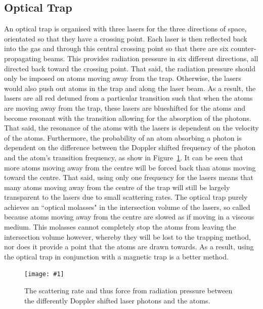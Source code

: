\documentclass[twocolumn]{article}
\newcommand{\insertFigure}[1]{%
   \texttt{[image: \#1]}%
}
\begin{document}
\subsection{Optical Trap}
An optical trap is organised with three lasers for the three directions of space, orientated so that they have a crossing point. Each laser is then reflected back into the gas and through this central crossing point so that there are six counter-propagating beams. This provides radiation pressure in six different directions, all directed back toward the crossing point. That said, the radiation pressure should only be imposed on atoms moving away from the trap. Otherwise, the lasers would also push out atoms in the trap and along the laser beam. As a result, the lasers are all red detuned from a particular transition such that when the atoms are moving away from the trap, these lasers are blueshifted for the atoms and become resonant with the transition allowing for the absorption of the photons. That said, the resonance of the atoms with the lasers is dependent on the velocity of the atoms. Furthermore, the probability of an atom absorbing a photon is dependent on the difference between the Doppler shifted frequency of the photon and the atom's transition frequency, as show in Figure~\ref{fig:Scat}. It can be seen that more atoms moving away from the centre will be forced back than atoms moving toward the centre. That said, using only one frequency for the lasers means that many atoms moving away from the centre of the trap will still be largely transparent to the lasers due to small scattering rates. The optical trap purely achieves an ``optical molasses" in the intersection volume of the lasers, so called because atoms moving away from the centre are slowed as if moving in a viscous medium. This molasses cannot completely stop the atoms from leaving the intersection volume however, whereby they will be lost to the trapping method, nor does it provide a point that the atoms are drawn towards. As a result, using the optical trap in conjunction with a magnetic trap is a better method.
\begin{figure} [!h]
	\centering
	\insertFigure{Images/Scat.png}
	\caption{The scattering rate and thus force from radiation pressure between the differently Doppler shifted laser photons and the atoms.~\cite{Wieman}}
	\label{fig:Scat}
\end{figure}
\end{document}
